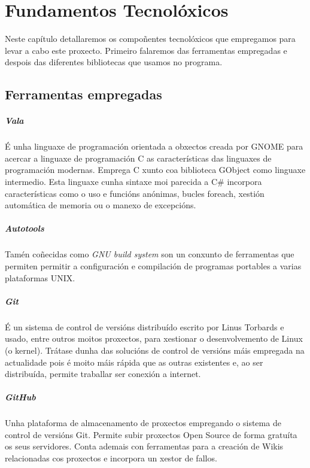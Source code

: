 \chapter{Fundamentos Tecnolóxicos}

Neste capítulo detallaremos os compoñentes tecnolóxicos que empregamos para levar a cabo este proxecto. Primeiro falaremos das ferramentas empregadas e despois das diferentes bibliotecas que usamos no programa.

\section{Ferramentas empregadas}

\paragraph{Vala} É unha linguaxe de programación orientada a obxectos creada por GNOME para acercar a linguaxe de programación C as características das linguaxes de programación modernas. Emprega C xunto coa biblioteca GObject como linguaxe intermedio. Esta linguaxe cunha sintaxe moi parecida a C\# incorpora características como o uso e funcións anónimas, bucles foreach, xestión automática de memoria ou o manexo de excepcións.


 \paragraph{Autotools} Tamén coñecidas como \emph{GNU build system} son un conxunto de ferramentas que permiten permitir a configuración e compilación de programas portables a varias plataformas UNIX.

 \paragraph{Git} É un sistema de control de versións distribuído escrito por Linus Torbards e usado, entre outros moitos proxectos, para xestionar o desenvolvemento de Linux (o kernel). Trátase dunha das solucións de control de versións máis empregada na actualidade pois é moito máis rápida que as outras existentes e, ao ser distribuída, permite traballar ser conexión a internet.

 \paragraph{GitHub} Unha plataforma de almacenamento de proxectos empregando o sistema de control de versións Git. Permite subir proxectos Open Source de forma gratuíta os seus servidores. Conta ademais con ferramentas para a creación de Wikis relacionadas cos proxectos e incorpora un xestor de fallos.

